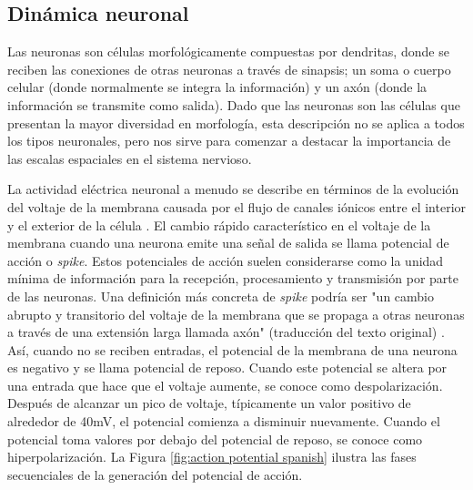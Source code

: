 \subsection{Dinámica neuronal}
Las neuronas son células morfológicamente compuestas por dendritas, donde se reciben las conexiones de otras neuronas a través de sinapsis; un soma o cuerpo celular (donde normalmente se integra la información) y un axón (donde la información se transmite como salida). Dado que las neuronas son las células que presentan la mayor diversidad en morfología, esta descripción no se aplica a todos los tipos neuronales, pero nos sirve para comenzar a destacar la importancia de las escalas espaciales en el sistema nervioso.

La actividad eléctrica neuronal a menudo se describe en términos de la evolución del voltaje de la membrana causada por el flujo de canales iónicos entre el interior y el exterior de la célula \parencite{kandel_principles_2012}. El cambio rápido característico en el voltaje de la membrana cuando una neurona emite una señal de salida se llama potencial de acción o \textit{spike}. Estos potenciales de acción suelen considerarse como la unidad mínima de información para la recepción, procesamiento y transmisión por parte de las neuronas. Una definición más concreta de \textit{spike} podría ser "un cambio abrupto y transitorio del voltaje de la membrana que se propaga a otras neuronas a través de una extensión larga llamada axón" (traducción del texto original) \parencite{izhikevich_dynamical_2007}. Así, cuando no se reciben entradas, el potencial de la membrana de una neurona es negativo y se llama potencial de reposo. Cuando este potencial se altera por una entrada que hace que el voltaje aumente, se conoce como despolarización. Después de alcanzar un pico de voltaje, típicamente un valor positivo de alrededor de 40mV, el potencial comienza a disminuir nuevamente. Cuando el potencial toma valores por debajo del potencial de reposo, se conoce como hiperpolarización. La Figura \ref{fig:action potential spanish} ilustra las fases secuenciales de la generación del potencial de acción.

